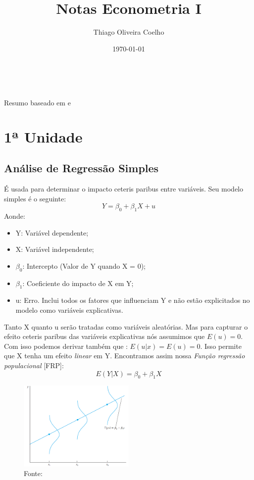 \documentclass[12pt,a4paper,oneside,brazil]{abntex2}
\title{Notas Econometria I}
\author{Thiago Oliveira Coelho}
\date{\today}
\begin{document}
\pagestyle{plain}

\maketitle\
\begin{center}
Resumo baseado em \cite{gujarati} e \cite{wooldridge}
\end{center}
\tableofcontents

\chapter{1ª Unidade}

\section{Análise de Regressão Simples}
É usada para determinar o impacto ceteris paribus entre variáveis. Seu modelo simples é o seguinte:
\[ Y = \beta_0 + \beta_1 X + u \]
Aonde:
\begin{itemize}
\item Y: Variável dependente;
\item X: Variável independente;
\item $\beta_0$: Intercepto (Valor de Y quando X = 0);
\item $\beta_1$: Coeficiente do impacto de X em Y;
\item u: Erro. Inclui todos os fatores que influenciam Y e não estão explicitados no modelo como variáveis explicativas.
\end{itemize}
Tanto X quanto u serão tratadas como variáveis aleatórias. Mas para capturar o efeito ceteris paribus das variáveis explicativas nós assumimos que $E(u) = 0$. Com isso podemos derivar também que : $E(u|x) = E(u) = 0$. Isso permite que X tenha um efeito \emph{linear} em Y. \newline
Encontramos assim nossa \emph{Função regressão populacional} [FRP]:
\[ E(Y|X) = \beta_0 + \beta_1 X\]

\begin{figure}
	\includegraphics[width=0.5\textwidth]{OLS.png}
	\centering
	\caption{Fonte: \cite{wooldridge}}
\end{figure}
\end{document}
